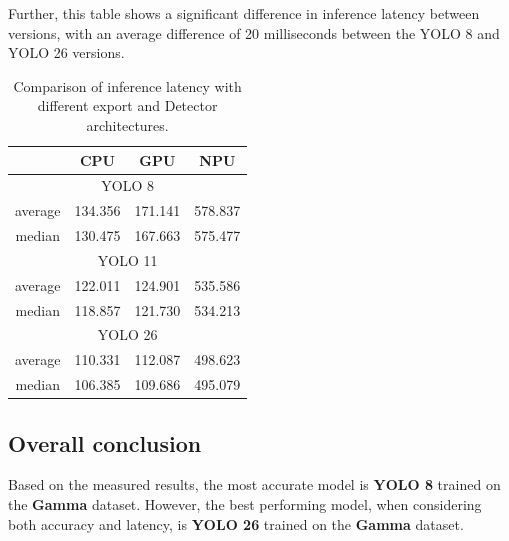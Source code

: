 Further, this table shows a significant difference in inference latency between versions, with an average difference of 20 milliseconds between the YOLO 8 and YOLO 26 versions. 

\begin{table}[hbt]
\caption{Comparison of inference latency with different export and Detector architectures.}
\label{expYoloVersionsSpeed}
\centering
\begin{tabular}{|cccc|}
\hline
\multicolumn{1}{|c|}{}        & \multicolumn{1}{c|}{CPU}     & \multicolumn{1}{c|}{GPU}     & NPU     \\ \hline
\multicolumn{4}{|c|}{YOLO 8}                                                                          \\ \hline
\multicolumn{1}{|c|}{average} & \multicolumn{1}{c|}{134.356} & \multicolumn{1}{c|}{171.141} & 578.837 \\ \hline
\multicolumn{1}{|c|}{median}  & \multicolumn{1}{c|}{130.475} & \multicolumn{1}{c|}{167.663} & 575.477 \\ \hline
\multicolumn{4}{|c|}{YOLO 11}                                                                         \\ \hline
\multicolumn{1}{|c|}{average} & \multicolumn{1}{c|}{122.011} & \multicolumn{1}{c|}{124.901} & 535.586 \\ \hline
\multicolumn{1}{|c|}{median}  & \multicolumn{1}{c|}{118.857} & \multicolumn{1}{c|}{121.730} & 534.213 \\ \hline
\multicolumn{4}{|c|}{YOLO 26}                                                                         \\ \hline
\multicolumn{1}{|c|}{average} & \multicolumn{1}{c|}{110.331} & \multicolumn{1}{c|}{112.087} & 498.623 \\ \hline
\multicolumn{1}{|c|}{median}  & \multicolumn{1}{c|}{106.385} & \multicolumn{1}{c|}{109.686} & 495.079 \\ \hline
\end{tabular}
\end{table}

\subsection{Overall conclusion}
Based on the measured results, the most accurate model is \textbf{YOLO 8} trained on the \textbf{Gamma} dataset. However, the best performing model, when considering both accuracy and latency, is \textbf{YOLO 26} trained on the \textbf{Gamma} dataset.

